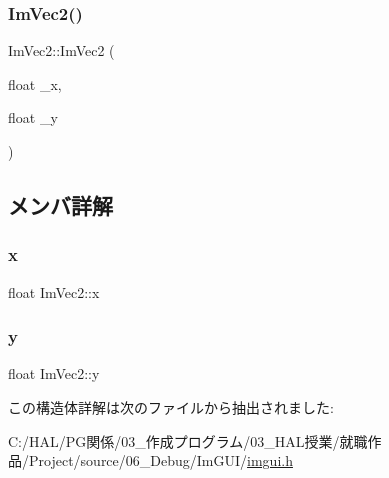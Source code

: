 \mbox{\label{struct_im_vec2_af2fd51a6c4bf6290676b235533b92c0d}} 
\subsubsection{\texorpdfstring{Im\+Vec2()}{ImVec2()}\hspace{0.1cm}{\footnotesize\ttfamily [2/2]}}
{\footnotesize\ttfamily Im\+Vec2\+::\+Im\+Vec2 (\begin{DoxyParamCaption}\item[{float}]{\+\_\+x,  }\item[{float}]{\+\_\+y }\end{DoxyParamCaption})\hspace{0.3cm}{\ttfamily [inline]}}



\subsection{メンバ詳解}
\mbox{\label{struct_im_vec2_a5802a68560961ed8cb8cc5fb2a244c2d}} 
\subsubsection{\texorpdfstring{x}{x}}
{\footnotesize\ttfamily float Im\+Vec2\+::x}

\mbox{\label{struct_im_vec2_a1f9d136ca837e147b793b19d25a3a618}} 
\subsubsection{\texorpdfstring{y}{y}}
{\footnotesize\ttfamily float Im\+Vec2\+::y}



この構造体詳解は次のファイルから抽出されました\+:\begin{DoxyCompactItemize}
\item 
C\+:/\+H\+A\+L/\+P\+G関係/03\+\_\+作成プログラム/03\+\_\+\+H\+A\+L授業/就職作品/\+Project/source/06\+\_\+\+Debug/\+Im\+G\+U\+I/\mbox{\hyperlink{imgui_8h}{imgui.\+h}}\end{DoxyCompactItemize}
